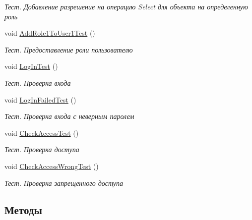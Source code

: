 \begin{DoxyCompactItemize}
\begin{DoxyCompactList}\small\item\em Тест. Добавление разрешение на операцию Select для объекта на определенную роль \end{DoxyCompactList}\item 
void \hyperlink{class_security_1_1_tests_1_1_tests_1_1_fake_security_work_unit_test_a6bc057a5c6fb87dbb19906e9c23ccf45}{Add\+Role1\+To\+User1\+Test} ()
\begin{DoxyCompactList}\small\item\em Тест. Предоставление роли пользователю \end{DoxyCompactList}\item 
void \hyperlink{class_security_1_1_tests_1_1_tests_1_1_fake_security_work_unit_test_a09dc978215ce2558edcb78ea380c6b2a}{Log\+In\+Test} ()
\begin{DoxyCompactList}\small\item\em Тест. Проверка входа \end{DoxyCompactList}\item 
void \hyperlink{class_security_1_1_tests_1_1_tests_1_1_fake_security_work_unit_test_a3a372a8eb2f3791650eb21a061e15224}{Log\+In\+Failed\+Test} ()
\begin{DoxyCompactList}\small\item\em Тест. Проверка входа с неверным паролем \end{DoxyCompactList}\item 
void \hyperlink{class_security_1_1_tests_1_1_tests_1_1_fake_security_work_unit_test_a2da79c29f4b39e85c7decdddb31035de}{Check\+Access\+Test} ()
\begin{DoxyCompactList}\small\item\em Тест. Проверка доступа \end{DoxyCompactList}\item 
void \hyperlink{class_security_1_1_tests_1_1_tests_1_1_fake_security_work_unit_test_a1a77f767a7129dd5fde97f393eeab1f3}{Check\+Access\+Wrong\+Test} ()
\begin{DoxyCompactList}\small\item\em Тест. Проверка запрещенного доступа \end{DoxyCompactList}\end{DoxyCompactItemize}


\subsection{Методы}
\mbox{\label{class_security_1_1_tests_1_1_tests_1_1_fake_security_work_unit_test_a658ca28eba33432fbe04e2f708ac1eff}} 
